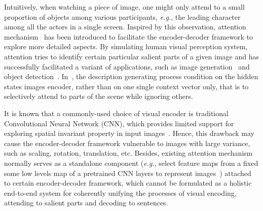 \documentclass[10pt,twocolumn,letterpaper]{article}
\begin{document}
	Intuitively, when watching a piece of image, one might only attend to a small proportion of objects among various participants, \emph{e.g.}, the leading character among all the actors in a single screen. Inspired by this observation, attention mechanism~\cite{xu2015show,mnih2014recurrent} has been introduced to facilitate the encoder-decoder framework to explore more detailed aspects. By simulating human visual perception system, attention tries to identify certain particular salient parts of a given image and has successfully facilitated a variant of applications, such as image generation~\cite{gregor2015draw} and object detection~\cite{zhou2015learning}. In~\cite{xu2015show}, the description generating process condition on the hidden states images encoder, rather than on one single context vector only, that is to selectively attend to parts of the scene while ignoring others.
	
	It is known that a commonly-used choice of visual encoder is traditional Convolutional Neural Network (CNN), which provides limited support for exploring spatial invariant property in input images~\cite{jaderberg2015spatial}. Hence, this drawback may cause the encoder-decoder framework vulnerable to images with large variance, such as scaling, rotation, translation, etc. Besides, existing attention mechanism normally serves as a standalone component (\emph{e.g.}, select feature maps from a fixed some low levels map of a pretrained CNN layers to represent images~\cite{xu2015show}) attached to certain encoder-decoder framework, which cannot be formulated as a holistic end-to-end system for coherently unifying the processes of visual encoding, attending to salient parts and decoding to sentences.
	
\end{document}
